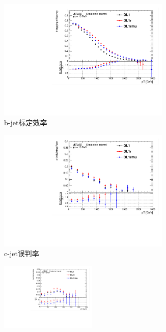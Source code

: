 \begin{figure}[!thbp]
  \begin{subfigure}{.5\textwidth}
  \centering
   \includegraphics[width=0.9\textwidth]{figuresDijet/02-Selection/Zprime/Comparebtageff_Fix77.pdf}
  \caption{b-jet标定效率}
  \end{subfigure}
  \begin{subfigure}{.5\textwidth}
  \centering
   \includegraphics[width=0.9\textwidth]{figuresDijet/02-Selection/Zprime/Comparectageff_Fix77.pdf}
  \caption{c-jet误判率}
  \end{subfigure}
\newline 
  \begin{subfigure}{.99\textwidth}
  \centering
   \includegraphics[width=0.5\textwidth]{figuresDijet/02-Selection/Zprime/Compareltageff_Fix77.pdf}

\end{subfigure}
\end{figure}
